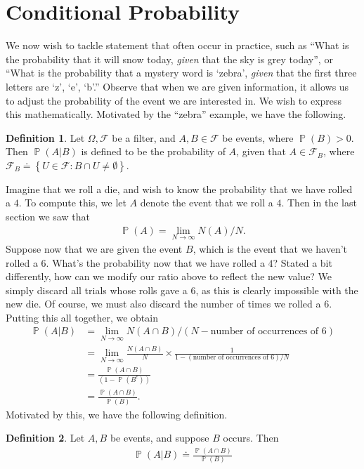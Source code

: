 \documentclass[12pt]{amsbook}
\newcommand{\filter}{\mathcal{F}}
\DeclareMathOperator{\prob}{\mathbb{P}}
\theoremstyle{plain}
\theoremstyle{definition}
\newtheorem*{definition}{Definition}
\theoremstyle{remark}
\numberwithin{equation}{section}  %
\numberwithin{equation}{section}  %
\begin{document}
\section{Conditional Probability}
We now wish to tackle statement that often occur in practice,
such as ``What is the probability that it will snow today, \emph{given}
that the sky is grey today'', or ``What is the probability that a mystery word
is `zebra', \emph{given} that the first three letters are
`z', `e', `b'.''
Observe that when we are given information, it allows us to adjust the
probability of the event we are interested in. We wish to express this
mathematically. Motivated by the ``zebra'' example, we have the following.
\begin{definition}
	Let $\Omega, \filter$ be a filter, and $A, B \in \filter$ be events, where
	$\prob(B) > 0$. Then $\prob(A | B)$ is defined to be the probability of 
	$A$, given that $A \in \filter_B$, where $\filter_B
	\doteq \left\{ U \in \filter: B \cap U \neq \emptyset \right\}$.
\end{definition}
Imagine that we roll a die, and wish to know the probability that
we have rolled a $4$.
To compute this, we let $A$ denote the event that we roll a $4$. Then in the 
last section we saw
that
\begin{align*}
	\prob(A) = \lim_{N \to \infty} N(A)/N.
\end{align*}
Suppose now that we are given the event $B$, which is the event that we haven't
rolled a $6$.
What's the probability now that we have rolled a $4$?
Stated a bit differently, how can we modify our ratio above to reflect the
new value? We simply discard all trials whose rolls gave a $6$, as this is 
clearly
impossible with the new die. Of course, we must also discard the number of times
we rolled a $6$. Putting this all together, we obtain
\begin{align*}
	\prob(A | B) & = \lim_{N \to \infty} N(A \cap B)/(N -
	\text{number of occurrences of $6$})
	\\
	& = \lim_{N \to \infty} \frac{N(A \cap B)}{N}
	\times \frac{1}{1 - (\text{number of occurrences of $6$})/N}
	\\
	& = \frac{\prob(A \cap B)}{(1 - \prob(B^c))}
	\\
	& = \frac{\prob(A \cap B)}{\prob(B)}.
\end{align*}
Motivated by this, we have the following definition.
\begin{definition}
	Let $A, B$ be events, and suppose $B$ occurs. Then
	\begin{align*}
		\prob(A | B) \doteq \frac{\prob(A \cap B)}{\prob(B)}
	\end{align*}
\end{definition}
\end{document}
